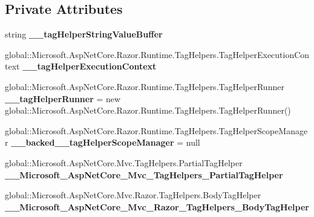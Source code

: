 \subsection*{Private Attributes}
\begin{DoxyCompactItemize}
\item 
\mbox{\label{class_asp_net_core_1_1_views___shared_____layout_aef4e642c2f9cf02bfdb978430374f539}} 
string {\bfseries \+\_\+\+\_\+tag\+Helper\+String\+Value\+Buffer}
\item 
\mbox{\label{class_asp_net_core_1_1_views___shared_____layout_a54b43df00545a372fe45f3554c22122b}} 
global\+::\+Microsoft.\+Asp\+Net\+Core.\+Razor.\+Runtime.\+Tag\+Helpers.\+Tag\+Helper\+Execution\+Context {\bfseries \+\_\+\+\_\+tag\+Helper\+Execution\+Context}
\item 
\mbox{\label{class_asp_net_core_1_1_views___shared_____layout_a260b7a30725f0b942da4ab10936be3c8}} 
global\+::\+Microsoft.\+Asp\+Net\+Core.\+Razor.\+Runtime.\+Tag\+Helpers.\+Tag\+Helper\+Runner {\bfseries \+\_\+\+\_\+tag\+Helper\+Runner} = new global\+::\+Microsoft.\+Asp\+Net\+Core.\+Razor.\+Runtime.\+Tag\+Helpers.\+Tag\+Helper\+Runner()
\item 
\mbox{\label{class_asp_net_core_1_1_views___shared_____layout_ad14604aa16ce9e8a80a3dd2bf8619d7d}} 
global\+::\+Microsoft.\+Asp\+Net\+Core.\+Razor.\+Runtime.\+Tag\+Helpers.\+Tag\+Helper\+Scope\+Manager {\bfseries \+\_\+\+\_\+backed\+\_\+\+\_\+tag\+Helper\+Scope\+Manager} = null
\item 
\mbox{\label{class_asp_net_core_1_1_views___shared_____layout_ae8080661784a13454f5370c0f1302184}} 
global\+::\+Microsoft.\+Asp\+Net\+Core.\+Mvc.\+Tag\+Helpers.\+Partial\+Tag\+Helper {\bfseries \+\_\+\+\_\+\+Microsoft\+\_\+\+Asp\+Net\+Core\+\_\+\+Mvc\+\_\+\+Tag\+Helpers\+\_\+\+Partial\+Tag\+Helper}
\item 
\mbox{\label{class_asp_net_core_1_1_views___shared_____layout_a9e38fd4aadf0a5c1961dc7646b23af96}} 
global\+::\+Microsoft.\+Asp\+Net\+Core.\+Mvc.\+Razor.\+Tag\+Helpers.\+Body\+Tag\+Helper {\bfseries \+\_\+\+\_\+\+Microsoft\+\_\+\+Asp\+Net\+Core\+\_\+\+Mvc\+\_\+\+Razor\+\_\+\+Tag\+Helpers\+\_\+\+Body\+Tag\+Helper}

\end{DoxyCompactItemize}
